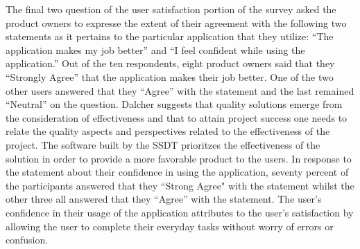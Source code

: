 The final two question of the user satisfaction portion of the survey asked the product owners to expresse the extent of their agreement with the following two statements as it pertains to the particular application that they utilize: ``The application makes my job better'' and ``I feel confident while using the application.'' Out of the ten respondents, eight product owners said that they ``Strongly Agree'' that the application makes their job better. One of the two other users answered that they ``Agree'' with the statement and the last remained ``Neutral'' on the question.  Dalcher \cite{dalcher2009software} suggests that quality solutions emerge from the consideration of effectiveness and that to attain project success one needs to relate the quality aspects and perspectives related to the effectiveness of the project. The software built by the SSDT prioritzes the effectiveness of the solution in order to provide a more favorable product to the users. In response to the statement about their confidence in using the application, seventy percent of the participants answered that they ``Strong Agree" with the statement whilst the other three all answered that they ``Agree'' with the statement. The user's confidence in their usage of the application attributes to the user's satisfaction by allowing the user to complete their everyday tasks without worry of errors or confusion.







